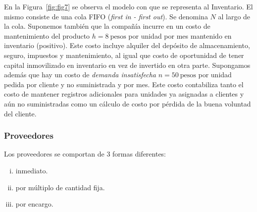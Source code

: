 \documentclass[10pt]{article}
\begin{document}
En la Figura~\ref{fig:fig7} se observa el modelo con que se representa al Inventario. El mismo consiste de una cola FIFO (\textit{first in - first out}). Se denomina $N$ al largo de la cola.
Suponemos también que la compañía incurre en un costo de mantenimiento del producto $h = 8~\textrm{pesos}$ por unidad por mes mantenido en inventario (positivo). Este costo incluye alquiler del depósito de almacenamiento, seguro, impuestos y mantenimiento, al igual que costo de oportunidad de tener capital inmovilizado en inventario en vez de invertido en otra parte. Supongamos además que hay un costo de \textit{demanda insatisfecha} $n = 50~\textrm{pesos}$ por unidad pedida por cliente y no suministrada y por mes. Este costo contabiliza tanto el costo de mantener registros adicionales para unidades ya asignadas a clientes y aún no suministradas como un cálculo de costo por pérdida de la buena voluntad del cliente.


\subsubsection{Proveedores}

Los proveedores se comportan de 3 formas diferentes: 
\begin{enumerate}[i)]
\item inmediato.
\item por múltiplo de cantidad fija.
\item por encargo.
\end{enumerate}
\end{document}
